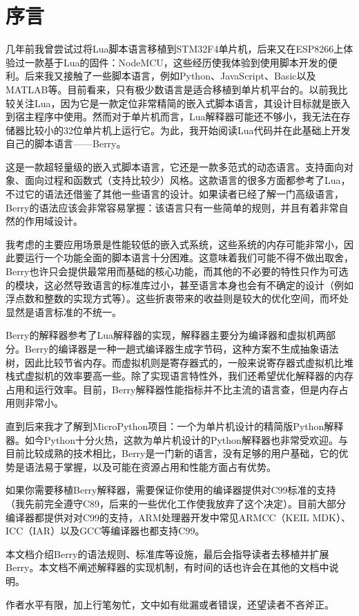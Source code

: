 \chapter*{序\quad 言}

\pagestyle{empty}
\thispagestyle{empty}

几年前我曾尝试过将Lua脚本语言移植到STM32F4单片机，后来又在ESP8266上体验过一款基于Lua的固件：NodeMCU，这些经历使我体验到使用脚本开发的便利。后来我又接触了一些脚本语言，例如Python、JavaScript、Basic以及MATLAB等。目前看来，只有极少数语言是适合移植到单片机平台的。以前我比较关注Lua，因为它是一款定位非常精简的嵌入式脚本语言，其设计目标就是嵌入到宿主程序中使用。然而对于单片机而言，Lua解释器可能还不够小，我无法在存储器比较小的32位单片机上运行它。为此，我开始阅读Lua代码并在此基础上开发自己的脚本语言------Berry。

这是一款超轻量级的嵌入式脚本语言，它还是一款多范式的动态语言。支持面向对象、面向过程和函数式（支持比较少）风格。这款语言的很多方面都参考了Lua，不过它的语法还借鉴了其他一些语言的设计。如果读者已经了解一门高级语言，Berry的语法应该会非常容易掌握：该语言只有一些简单的规则，并且有着非常自然的作用域设计。

我考虑的主要应用场景是性能较低的嵌入式系统，这些系统的内存可能非常小，因此要运行一个功能全面的脚本语言十分困难。这意味着我们可能不得不做出取舍，Berry也许只会提供最常用而基础的核心功能，而其他的不必要的特性只作为可选的模块，这必然导致语言的标准库过小，甚至语言本身也会有不确定的设计（例如浮点数和整数的实现方式等）。这些折衷带来的收益则是较大的优化空间，而坏处显然是语言标准的不统一。

Berry的解释器参考了Lua解释器的实现，解释器主要分为编译器和虚拟机两部分。Berry的编译器是一种一趟式编译器生成字节码，这种方案不生成抽象语法树，因此比较节省内存。而虚拟机则是寄存器式的，一般来说寄存器式虚拟机比堆栈式虚拟机的效率要高一些。除了实现语言特性外，我们还希望优化解释器的内存占用和运行效率。目前，Berry解释器性能指标并不比主流的语言查，但是内存占用则非常小。

直到后来我才了解到MicroPython项目：一个为单片机设计的精简版Python解释器。如今Python十分火热，这款为单片机设计的Python解释器也非常受欢迎。与目前比较成熟的技术相比，Berry是一门新的语言，没有足够的用户基础，它的优势是语法易于掌握，以及可能在资源占用和性能方面占有优势。

如果你需要移植Berry解释器，需要保证你使用的编译器提供对C99标准的支持（我先前完全遵守C89，后来的一些优化工作使我放弃了这个决定）。目前大部分编译器都提供对对C99的支持，ARM处理器开发中常见ARMCC（KEIL MDK）、ICC（IAR）以及GCC等编译器也都支持C99。

本文档介绍Berry的语法规则、标准库等设施，最后会指导读者去移植并扩展Berry。本文档不阐述解释器的实现机制，有时间的话也许会在其他的文档中说明。

作者水平有限，加上行笔匆忙，文中如有纰漏或者错误，还望读者不吝斧正。


